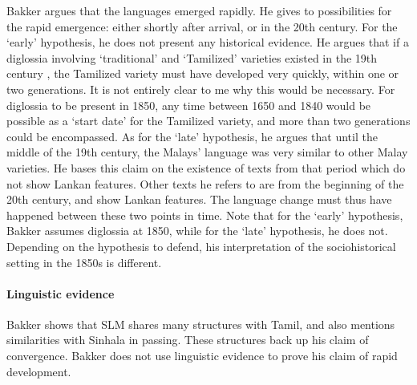 Bakker argues that the languages emerged rapidly. He gives to possibilities for the rapid emergence: either shortly after arrival, or in the 20th century. For the `early' hypothesis, he does not present any historical evidence. He argues that if a diglossia involving `traditional' and `Tamilized' varieties existed in the 19th century \citep{SmithEtAl2007}, the Tamilized variety must have developed very quickly, within one or two generations. It is not entirely clear to me why this would be necessary. For diglossia to be present in 1850, any time between 1650 and 1840 would be possible as a `start date' for the Tamilized variety, and more than two generations could be encompassed. As for the `late' hypothesis, he argues that until the middle of the 19th century, the Malays' language was very similar to other Malay varieties. He bases this claim on the existence of texts from that period which do not show Lankan features. Other texts he refers to are from the beginning of the 20th century, and show Lankan features. The language change must thus have happened between these two points in time. Note that for the `early' hypothesis, Bakker assumes diglossia at 1850, while for the `late' hypothesis, he does not. Depending on the hypothesis to defend, his interpretation of the sociohistorical setting in the 1850s is different.

 

\paragraph{Linguistic evidence}
Bakker shows that SLM shares many structures with Tamil, and also mentions similarities with Sinhala in passing. These structures back up his claim of convergence. Bakker does not use linguistic evidence to prove his claim of rapid development.

